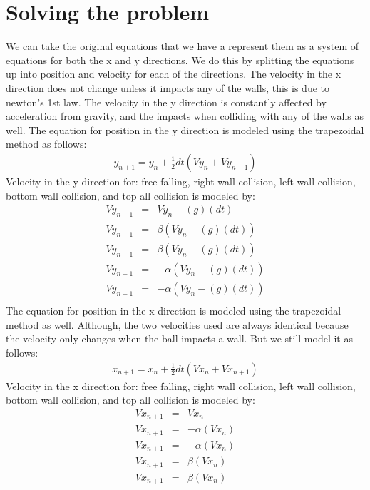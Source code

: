 \documentclass[12pt]{article}
\begin{document}
\section{Solving the problem}\label{sec::Solving the problem}
We can take the original equations that we have a represent them as a system of equations for both the x and y directions. We do this by splitting the equations up into position and velocity for each of the directions. The velocity in the x direction does not change unless it impacts any of the walls, this is due to newton's 1st law.  The velocity in the y direction is constantly affected by acceleration from gravity, and the impacts when colliding with any of the walls as well.  The equation for position in the y direction is modeled using the trapezoidal method as follows:
\begin{eqnarray}
y_{n+1} = y_{n} + \frac{1}{2} dt (Vy_{n}+Vy_{n+1})\nonumber
\end{eqnarray}
Velocity in the y direction for: free falling, right wall collision, left wall collision, bottom wall collision, and top all collision is modeled by:
\begin{eqnarray}
Vy_{n+1} &=& Vy_{n} - (g)(dt)  \\\nonumber
Vy_{n+1} &=& \beta(Vy_{n} - (g)(dt)) \\\nonumber
Vy_{n+1} &=& \beta(Vy_{n} - (g)(dt))  \\\nonumber
Vy_{n+1} &=& - \alpha(Vy_{n} - (g)(dt)) \\\nonumber
Vy_{n+1} &=& - \alpha(Vy_{n} - (g)(dt)) \\\nonumber 
\end{eqnarray}
The equation for position in the x direction is modeled using the trapezoidal method as well. Although, the two velocities used are always identical because the velocity only changes when the ball impacts a wall. But we still model it as follows:
\begin{eqnarray}
x_{n+1} = x_{n} + \frac{1}{2} dt (Vx_{n}+Vx_{n+1})\nonumber
\end{eqnarray}
Velocity in the x direction for: free falling, right wall collision, left wall collision, bottom wall collision, and top all collision is modeled by:
\begin{eqnarray}
Vx_{n+1} &=& Vx_{n}  \\\nonumber
Vx_{n+1} &=& - \alpha(Vx_{n}) \\\nonumber
Vx_{n+1} &=& - \alpha(Vx_{n})  \\\nonumber
Vx_{n+1} &=& \beta(Vx_{n}) \\\nonumber
Vx_{n+1} &=& \beta(Vx_{n}) \\\nonumber 
\end{eqnarray}
\end{document}
